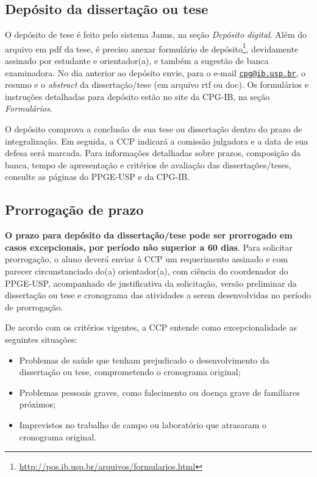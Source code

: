 \subsection{Depósito da dissertação ou tese}
\label{sec:depos-da-diss}

O depósito de tese é feito pelo sistema Janus, na seção \emph{Depósito
  digital}. Além do arquivo em pdf da tese, é preciso anexar
formulário de
depósito\footnote{\url{http://pos.ib.usp.br/arquivos/formularios.html}},
devidamente assinado por estudante e orientador(a), e também a
sugestão de banca examinadora. No dia anterior ao depósito envie, para
o e-mail \href{mailto:cpg@ib.usp.br}{\nolinkurl{cpg@ib.usp.br}}, o
resumo e o \emph{abstract} da dissertação/tese (em arquivo rtf ou
doc). Os formulários e instruções detalhadas para depósito estão no
site da CPG-IB, na seção \emph{Formulários}.

O depósito comprova a conclusão de sua tese ou dissertação dentro do
prazo de integralização. Em seguida, a CCP indicará a comissão
julgadora e a data de sua defesa será marcada. Para informações
detalhadas sobre prazos, composição da banca, tempo de apresentação e
critérios de avaliação das dissertações/teses, consulte as páginas do
PPGE-USP e da CPG-IB.

\subsection{Prorrogação de prazo}

\textbf{O prazo para depósito da dissertação/tese pode ser prorrogado
  em casos excepcionais, por período não superior a 60 dias}. Para
solicitar prorrogação, o aluno deverá enviar à CCP um requerimento
assinado e com parecer circunstanciado do(a) orientador(a), com
ciência do coordenador do PPGE-USP, acompanhado de justificativa da
solicitação, versão preliminar da dissertação ou tese e cronograma das
atividades a serem desenvolvidas no período de prorrogação.

De acordo com os critérios vigentes, a CCP entende como
excepcionalidade as seguintes situações:

\begin{itemize}
\item Problemas de saúde que tenham prejudicado o desenvolvimento da
  dissertação ou tese, comprometendo o cronograma original;
\item Problemas pessoais graves, como falecimento ou doença grave de
  familiares próximos;
\item Imprevistos no trabalho de campo ou laboratório que atrasaram o
  cronograma original.
\end{itemize}

